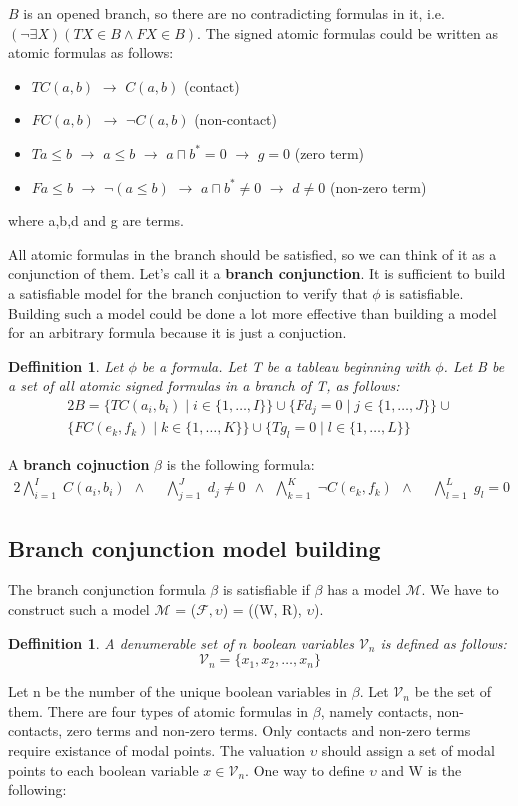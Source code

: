 \documentclass{article}
\newcommand\M{\mathcal{M}}
\newcommand\F{\mathcal{F}}
\newcommand\V{\mathcal{V}}
\newtheorem{defn}[theorem]{Deffinition}
\newcommand{\BranchConjunction}{%
\begin{alignat}{2}
			\bigwedge_{i=1}^{I} \; C(a_i, b_i) \:\: \wedge \:\: &
			\bigwedge_{j=1}^{J} \; d_j \neq 0 \:\: \wedge \:\:
			\bigwedge_{k=1}^{K} \; \neg C(e_k, f_k) \:\: \wedge \:\: &
			\bigwedge_{l=1}^{L} \; g_l = 0 \:\:
\end{alignat}%
}
\begin{document}
		\noindent $B$ is an opened branch, so there are no contradicting formulas in it, i.e. $(\neg \exists X)(T X \in B \land F X \in B)$.
		The signed atomic formulas could be written as atomic formulas as follows:
		\begin{itemize}
			\item $T C(a,b)$ $\rightarrow$ $C(a,b)$ (contact)
			\item $F C(a,b)$ $\rightarrow$ $\neg C(a,b)$ (non-contact)
			\item $T a \leq b$ $\rightarrow$ $a \leq b$ $\rightarrow$ $a \sqcap b^*=0$ $\rightarrow$ $g = 0$ (zero term)
			\item $F a \leq b$ $\rightarrow$ $\neg (a \leq b)$ $\rightarrow$ $a \sqcap b^* \neq 0$ $\rightarrow$ $d \neq 0$ (non-zero term)
		\end{itemize}
			\noindent where a,b,d and g are terms.

		All atomic formulas in the branch should be satisfied, so we can think of it as a conjunction of them. Let's call it a \textbf{branch conjunction}. It is sufficient to build a satisfiable model for the branch conjuction to verify that $\phi$ is satisfiable. Building  such a model could be done a lot more effective than building a model for an arbitrary formula because it is just a conjuction.
		\begin{defn}
			\label{branch-conjunction}
			Let $\phi$ be a formula. Let T be a tableau beginning with $\phi$. Let B be a set of all atomic signed formulas in a branch of T, as follows:
			\begin{alignat}{2}
				B = \{T C(a_i, b_i) \mid i \in \{1, \ldots, I\} \} \cup
					\{F d_j = 0 \mid j \in \{1, \ldots, J\} \} \cup \\\nonumber
					\{F C(e_k, f_k) \mid k \in \{1, \ldots, K\} \} \cup
					\{T g_l = 0 \mid l \in \{1, \ldots, L\} \}
			\end{alignat}
		\end{defn}
		A \textbf{branch cojnuction} $\beta$ is the following formula:
		 \BranchConjunction

	\subsection{Branch conjunction model building}
		The branch conjunction formula $\beta$ is satisfiable if $\beta$ has a model $\M$. We have to construct such a model $\M$ = ($\F, \upsilon$) = ((W, R), $\upsilon$). 
		\begin{defn}
			A denumerable set of $n$ boolean variables $\V_n$ is defined as follows:
			\begin{equation}
				\label{boolean-evaluation}
				\V_n = \{x_1, x_2, \ldots , x_n \}
			\end{equation}
		\end{defn}
		Let n be the number of the unique boolean variables in $\beta$. Let $\V_n$ be the set of them. There are four types of atomic formulas in $\beta$, namely contacts, non-contacts, zero terms and non-zero terms. Only contacts and non-zero terms require existance of modal points. The valuation $\upsilon$ should assign a set of modal points to each boolean variable $x \in \V_n$. One way to define $\upsilon$ and W is the following:
		
\end{document}
